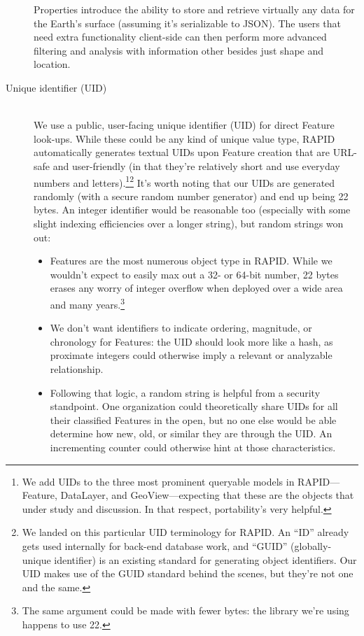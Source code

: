 \begin{description}
  Properties introduce the ability to store and retrieve virtually any data for the Earth's surface (assuming it's serializable to JSON). The users that need extra functionality client-side can then perform more advanced filtering and analysis with information other besides just shape and location.
  
  \item[Unique identifier (UID)] \hfill \\
  We use a public, user-facing unique identifier (UID) for direct Feature look-ups. While these could be any kind of unique value type, RAPID automatically generates textual UIDs upon Feature creation that are URL-safe and user-friendly (in that they're relatively short and use everyday numbers and letters).\footnote{We add UIDs to the three most prominent queryable models in RAPID---Feature, DataLayer, and GeoView---expecting that these are the objects that under study and discussion. In that respect, portability's very helpful.}\footnote{We landed on this particular UID terminology for RAPID. An ``ID'' already gets used internally for back-end database work, and ``GUID'' (globally-unique identifier) is an existing standard for generating object identifiers. Our UID makes use of the GUID standard behind the scenes, but they're not one and the same.} It's worth noting that our UIDs are generated randomly (with a secure random number generator) and end up being 22 bytes. An integer identifier would be reasonable too (especially with some slight indexing efficiencies over a longer string), but random strings won out:
  
  \begin{itemize}
  \item Features are the most numerous object type in RAPID. While we wouldn't expect to easily max out a 32- or 64-bit number, 22 bytes erases any worry of integer overflow when deployed over a wide area and many years.\footnote{The same argument could be made with fewer bytes: the library we're using happens to use 22.}
  \item We don't want identifiers to indicate ordering, magnitude, or chronology for Features: the UID should look more like a hash, as proximate integers could otherwise imply a relevant or analyzable relationship.
  \item Following that logic, a random string is helpful from a security standpoint. One organization could theoretically share UIDs for all their classified Features in the open, but no one else would be able determine how new, old, or similar they are through the UID. An incrementing counter could otherwise hint at those characteristics.
\end{itemize}
  

\end{description}
